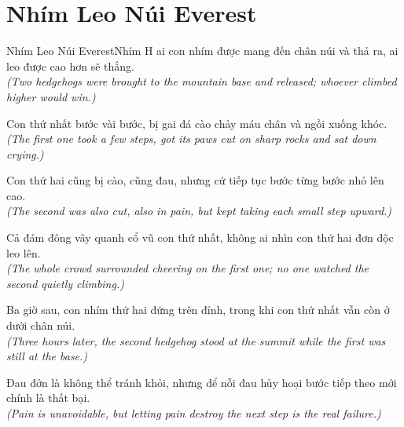 \section{Nhím Leo Núi Everest}
\begin{truyen}{Nhím Leo Núi Everest}{Nhím}
H ai con nhím được mang đến chân núi và thả ra, ai leo được cao hơn sẽ thắng.\\
\textit{(Two hedgehogs were brought to the mountain base and released; whoever climbed higher would win.)}

Con thứ nhất bước vài bước, bị gai đá cào chảy máu chân và ngồi xuống khóc.\\
\textit{(The first one took a few steps, got its paws cut on sharp rocks and sat down crying.)}

Con thứ hai cũng bị cào, cũng đau, nhưng cứ tiếp tục bước từng bước nhỏ lên cao.\\
\textit{(The second was also cut, also in pain, but kept taking each small step upward.)}

Cả đám đông vây quanh cổ vũ con thứ nhất, không ai nhìn con thứ hai đơn độc leo lên.\\
\textit{(The whole crowd surrounded cheering on the first one; no one watched the second quietly climbing.)}

Ba giờ sau, con nhím thứ hai đứng trên đỉnh, trong khi con thứ nhất vẫn còn ở dưới chân núi.\\
\textit{(Three hours later, the second hedgehog stood at the summit while the first was still at the base.)}

\end{truyen}
\begin{baihoc}
  Đau đớn là không thể tránh khỏi, nhưng để nỗi đau hủy hoại bước tiếp theo mới chính là thất bại.\\
  \textit{(Pain is unavoidable, but letting pain destroy the next step is the real failure.)}
\end{baihoc}

